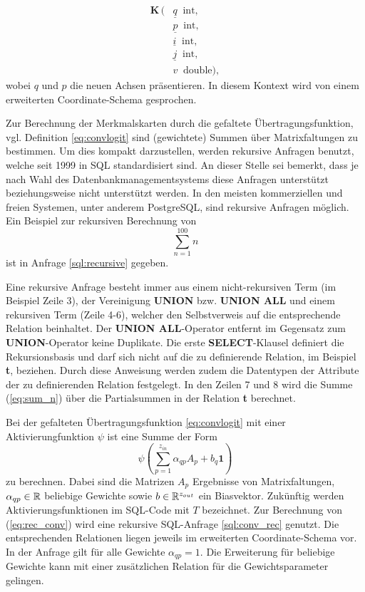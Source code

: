 \begin{align*}
    \mathbf{K}\, ( 
    &\underline{q} \; \; \mathrm{int},\\
    &\underline{p} \; \; \mathrm{int},\\
    &\underline{i} \; \; \mathrm{int}, \\    
    &\underline{j} \; \; \mathrm{int}, \\
    &v \; \; \mathrm{double}),
\end{align*}
wobei $q$ und $p$ die neuen Achsen präsentieren. In diesem Kontext wird von einem erweiterten Coordinate-Schema gesprochen.

Zur Berechnung der Merkmalskarten durch die gefaltete Übertragungsfunktion, vgl. Definition \ref{eq:convlogit} sind (gewichtete) Summen über Matrixfaltungen zu bestimmen. Um dies kompakt darzustellen, werden rekursive Anfragen benutzt, welche seit 1999 in SQL standardisiert sind. An dieser Stelle sei bemerkt, dass je nach Wahl des Datenbankmanagementsystems diese Anfragen unterstützt beziehungsweise nicht unterstützt werden. In den meisten kommerziellen und freien Systemen, unter anderem PostgreSQL, sind rekursive Anfragen möglich. Ein Beispiel zur rekursiven Berechnung von
\begin{equation}
   \label{eq:sum_n}
\sum_{n=1}^{100} n    
\end{equation} 
ist in Anfrage \ref{sql:recursive} gegeben. 



Eine rekursive Anfrage besteht immer aus einem nicht-rekursiven Term (im Beispiel Zeile 3), der Vereinigung \textbf{UNION} bzw. \textbf{UNION ALL} und einem rekursiven Term (Zeile 4-6), welcher den Selbstverweis auf die entsprechende Relation beinhaltet. Der \textbf{UNION ALL}-Operator entfernt im Gegensatz zum \textbf{UNION}-Operator keine Duplikate. Die erste \textbf{SELECT}-Klausel definiert die Rekursionsbasis und darf sich nicht auf die zu definierende Relation, im Beispiel \textbf{t}, beziehen. Durch diese Anweisung werden zudem die Datentypen der Attribute der zu definierenden Relation festgelegt. In den Zeilen 7 und 8 wird die Summe (\ref{eq:sum_n}) über die Partialsummen in der Relation \textbf{t} berechnet. 

Bei der gefalteten Übertragungsfunktion \ref{eq:convlogit} mit einer Aktivierungfunktion $\psi$ ist eine Summe der Form
\begin{equation}
    \label{eq:rec_conv}
    \psi \left(\sum_{p=1}^{z_{in}} \alpha_{qp} A_p+ b_q \mathbf{1} \right)
\end{equation}
zu berechnen. Dabei sind die Matrizen $A_p$ Ergebnisse von Matrixfaltungen, $\alpha_{qp} \in \mathbb{R}$ beliebige Gewichte sowie $b \in \mathbb{R}^{z_{out}}$ ein Biasvektor. Zukünftig werden Aktivierungsfunktionen im SQL-Code mit $T$ bezeichnet. Zur Berechnung von (\ref{eq:rec_conv}) wird eine rekursive SQL-Anfrage \ref{sql:conv_rec} genutzt. Die entsprechenden Relationen liegen jeweils im erweiterten Coordinate-Schema vor. In der Anfrage gilt für alle Gewichte $\alpha_{qp}=1$. Die Erweiterung für beliebige Gewichte kann mit einer zusätzlichen Relation für die Gewichtsparameter gelingen. 

